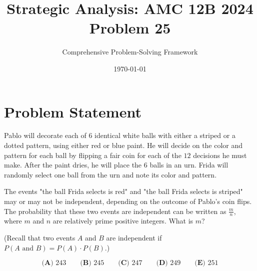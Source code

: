 \documentclass[12pt]{article}
\begin{document}
\title{\textbf{Strategic Analysis: AMC 12B 2024 Problem 25}}
\author{Comprehensive Problem-Solving Framework}
\date{\today}
\maketitle

\section*{Problem Statement}

Pablo will decorate each of $6$ identical white balls with either a striped or a dotted pattern, using either red or blue paint. He will decide on the color and pattern for each ball by flipping a fair coin for each of the $12$ decisions he must make. After the paint dries, he will place the $6$ balls in an urn. Frida will randomly select one ball from the urn and note its color and pattern. 

The events "the ball Frida selects is red" and "the ball Frida selects is striped" may or may not be independent, depending on the outcome of Pablo's coin flips. The probability that these two events are independent can be written as $\frac{m}{n}$, where $m$ and $n$ are relatively prime positive integers. What is $m$?

(Recall that two events $A$ and $B$ are independent if $P(A \text{ and } B) = P(A) \cdot P(B)$.)

$$\textbf{(A) } 243 \qquad \textbf{(B) } 245 \qquad \textbf{(C) } 247 \qquad \textbf{(D) } 249 \qquad \textbf{(E) } 251$$

\vspace{1cm}
\end{document}
